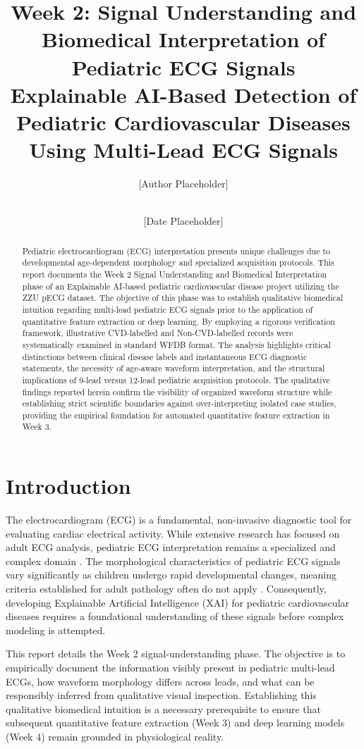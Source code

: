 \documentclass[11pt, a4paper]{article}
\title{\textbf{Week 2: Signal Understanding and Biomedical Interpretation of Pediatric ECG Signals}\\[0.5em]
\large Explainable AI-Based Detection of Pediatric Cardiovascular Diseases Using Multi-Lead ECG Signals}
\author{[Author Placeholder] \\ [Institution Placeholder] \\ [Project/Lab Placeholder]}
\date{[Date Placeholder]}
\begin{document}
\maketitle

\begin{abstract}
Pediatric electrocardiogram (ECG) interpretation presents unique challenges due to developmental age-dependent morphology and specialized acquisition protocols. This report documents the Week 2 Signal Understanding and Biomedical Interpretation phase of an Explainable AI-based pediatric cardiovascular disease project utilizing the ZZU pECG dataset. The objective of this phase was to establish qualitative biomedical intuition regarding multi-lead pediatric ECG signals prior to the application of quantitative feature extraction or deep learning. By employing a rigorous verification framework, illustrative CVD-labelled and Non-CVD-labelled records were systematically examined in standard WFDB format. The analysis highlights critical distinctions between clinical disease labels and instantaneous ECG diagnostic statements, the necessity of age-aware waveform interpretation, and the structural implications of 9-lead versus 12-lead pediatric acquisition protocols. The qualitative findings reported herein confirm the visibility of organized waveform structure while establishing strict scientific boundaries against over-interpreting isolated case studies, providing the empirical foundation for automated quantitative feature extraction in Week 3.
\end{abstract}

\section{Introduction}
The electrocardiogram (ECG) is a fundamental, non-invasive diagnostic tool for evaluating cardiac electrical activity. While extensive research has focused on adult ECG analysis, pediatric ECG interpretation remains a specialized and complex domain \cite{Tan2025}. The morphological characteristics of pediatric ECG signals vary significantly as children undergo rapid developmental changes, meaning criteria established for adult pathology often do not apply \cite{Tan2025}. Consequently, developing Explainable Artificial Intelligence (XAI) for pediatric cardiovascular diseases requires a foundational understanding of these signals before complex modeling is attempted. 

This report details the Week 2 signal-understanding phase. The objective is to empirically document the information visibly present in pediatric multi-lead ECGs, how waveform morphology differs across leads, and what can be responsibly inferred from qualitative visual inspection. Establishing this qualitative biomedical intuition is a necessary prerequisite to ensure that subsequent quantitative feature extraction (Week 3) and deep learning models (Week 4) remain grounded in physiological reality.
\end{document}
